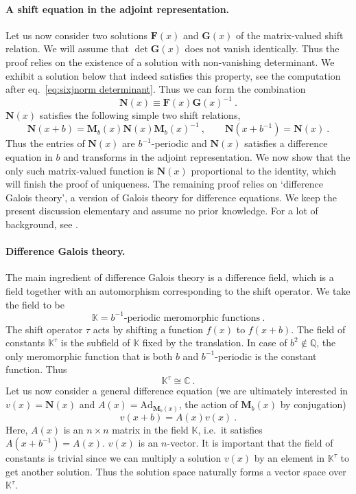 \documentclass[12pt,a4paper]{article}
\newcommand{\be}{\begin{equation}}
\newcommand{\ee}{\end{equation}}
\newcommand\CC{\mathbb{C}}
\newcommand\QQ{\mathbb{Q}}
\newcommand\KK{\mathbb{K}}
\begin{document}
\paragraph{A shift equation in the adjoint representation.} Let us now consider two solutions $\mathbf{F}(x)$ and $\mathbf{G}(x)$ of the matrix-valued shift relation. We will assume that $\det \mathbf{G}(x)$ does not vanish identically. Thus the proof relies on the existence of a solution with non-vanishing determinant. We exhibit a solution below that indeed satisfies this property, see the computation after eq.~\eqref{eq:sixjnorm determinant}. Thus we can form the combination
\be 
\mathbf{N}(x) \equiv \mathbf{F}(x) \mathbf{G}(x)^{-1}\ . \label{eq:N FG^-1}
\ee
$\mathbf{N}(x)$ satisfies the following simple two shift relations,
\be 
\mathbf{N}(x+b)=\mathbf{M}_b(x) \mathbf{N}(x) \mathbf{M}_b(x)^{-1}\ , \qquad \mathbf{N}(x+b^{-1})=\mathbf{N}(x)\ . \label{eq:shift relation N}
\ee
Thus the entries of $\mathbf{N}(x)$ are $b^{-1}$-periodic and $\mathbf{N}(x)$ satisfies a difference equation in $b$ and transforms in the adjoint representation. We now show that the only such matrix-valued function is $\mathbf{N}(x)$ proportional to the identity, which will finish the proof of uniqueness. The remaining proof relies on `difference Galois theory', a version of Galois theory for difference equations. We keep the present discussion elementary and assume no prior knowledge. For a lot of background, see \cite{Van2012Galois}.

\paragraph{Difference Galois theory.} The main ingredient of difference Galois theory is a difference field, which is a field together with an automorphism corresponding to the shift operator. We take the field to be
\be 
\KK=\text{$b^{-1}$-periodic meromorphic functions}\ . \label{eq:definition field K}
\ee
The shift operator $\tau$ acts by shifting a function $f(x)$ to $f(x+b)$. The field of constants $\KK^\tau$ is the subfield of $\KK$ fixed by the translation. In case of $b^2 \not \in \QQ$, the only meromorphic function that is both $b$ and $b^{-1}$-periodic is the constant function. Thus
\be 
\KK^\tau\cong \CC\ .
\ee
Let us now consider a general difference equation (we are ultimately interested in $v(x)=\mathbf{N}(x)$ and $A(x)=\text{Ad}_{\mathbf{M}_b(x)}$, the action of $\mathbf{M}_b(x)$ by conjugation)
\be 
v(x+b)=A(x) v(x)\ . \label{eq:formal difference equation}
\ee
Here, $A(x)$ is an $n \times n$ matrix in the field $\KK$, i.e.\ it satisfies $A(x+b^{-1})=A(x)$. $v(x)$ is an $n$-vector. It is important that the field of constants is trivial since we can multiply a solution $v(x)$ by an element in $\KK^\tau$ to get another solution. Thus the solution space naturally forms a vector space over $\KK^\tau$.
\end{document}
